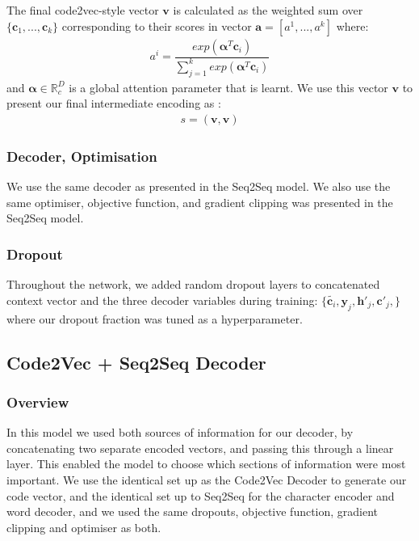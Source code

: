 The final code2vec-style vector $\textbf{v}$ is calculated as the weighted sum over  $\{\textbf{c}_1,...,\textbf{c}_k\}$ corresponding to their scores in vector $\textbf{a} = [a^1,...,a^k]$ where:
\begin{align}
    a^i = \dfrac{exp(\mathbf{\alpha}^{T}\mathbf{c}_i)}{\sum_{j=1}^kexp(\mathbf{\alpha}^{T}\mathbf{c}_i)}
\end{align}
and $\mathbf{\alpha} \in \mathbb{R}^D_c$ is a global attention parameter that is learnt.
We use this vector $\mathbf{v}$ to present our final intermediate encoding as :
\begin{align}
     s = (\mathbf{v}, \mathbf{v}) 
\end{align}

\subsubsection{Decoder, Optimisation}

We use the same decoder as presented in the Seq2Seq model.
We also use the same optimiser, objective function, and gradient clipping was presented in the Seq2Seq model.

\subsubsection{Dropout}

Throughout the network, we added random dropout layers to concatenated context vector and the three decoder variables during training:
$\{\tilde{\textbf{c}_i}, \textbf{y}_j, \textbf{h}'_j,  \textbf{c}'_j,\}$
where our dropout fraction was tuned as a hyperparameter. 


\subsection{Code2Vec + Seq2Seq Decoder} %
\label{sub:code2vec_sequence_to_sequence}

\subsubsection{Overview}

In this model we used both sources of information for our decoder, by concatenating two separate encoded vectors, and passing this through a linear layer. 
This enabled the model to choose which sections of information were most important.
We use the identical set up as the Code2Vec Decoder to generate our code vector, and the identical set up to Seq2Seq for the character encoder and word decoder, and we used the same dropouts, objective function, gradient clipping and optimiser as both.


